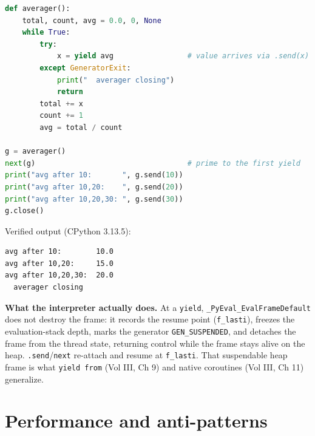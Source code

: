 \begin{lstlisting}[language=Python, caption={A running-average coroutine driven by send(), shut down by close().}]
def averager():
    total, count, avg = 0.0, 0, None
    while True:
        try:
            x = yield avg                 # value arrives via .send(x)
        except GeneratorExit:
            print("  averager closing")
            return
        total += x
        count += 1
        avg = total / count

g = averager()
next(g)                                   # prime to the first yield
print("avg after 10:       ", g.send(10))
print("avg after 10,20:    ", g.send(20))
print("avg after 10,20,30: ", g.send(30))
g.close()
\end{lstlisting}

Verified output (CPython 3.13.5):

\begin{lstlisting}[caption={Output}]
avg after 10:        10.0
avg after 10,20:     15.0
avg after 10,20,30:  20.0
  averager closing
\end{lstlisting}

\textbf{What the interpreter actually does.} At a \texttt{yield},
\texttt{\_PyEval\_EvalFrameDefault} does not destroy the frame: it records the resume point
(\texttt{f\_lasti}), freezes the evaluation-stack depth, marks the generator
\texttt{GEN\_SUSPENDED}, and detaches the frame from the thread state, returning control while
the frame stays alive on the heap. \texttt{.send}/\texttt{next} re-attach and resume at
\texttt{f\_lasti}. That suspendable heap frame is what \texttt{yield from} (Vol III, Ch 9) and
native coroutines (Vol III, Ch 11) generalize.

\section{Performance and anti-patterns}

